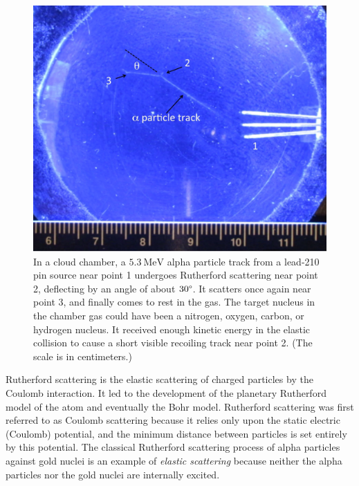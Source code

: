 \documentclass[%
 reprint,
nofootinbib,
 amsmath,amssymb,
 aps,
floatfix,
]{revtex4-2}
\begin{document}
    \begin{figure}
        \centering
        \includegraphics[scale = 0.15]{Figures/AlphaTrackRutherfordScattering3.jpg}
        \caption{In a cloud chamber, a $\SI{5.3}{\mega \electronvolt}$ alpha particle track from a lead-210 pin source near point 1 undergoes Rutherford scattering near point 2, deflecting by an angle of about $30 \degree$. It scatters once again near point 3, and finally comes to rest in the gas. The target nucleus in the chamber gas could have been a nitrogen, oxygen, carbon, or hydrogen nucleus. It received enough kinetic energy in the elastic collision to cause a short visible recoiling track near point 2. (The scale is in centimeters.)}
        \label{fig:cloudchamber}
    \end{figure}
    \par
    Rutherford scattering is the elastic scattering of charged particles by the Coulomb interaction. It led to the development of the planetary Rutherford model of the atom and eventually the Bohr model. Rutherford scattering was first referred to as Coulomb scattering because it relies only upon the static electric (Coulomb) potential, and the minimum distance between particles is set entirely by this potential. The classical Rutherford scattering process of alpha particles against gold nuclei is an example of \textit{elastic scattering} because neither the alpha particles nor the gold nuclei are internally excited.
    
    
\end{document}
